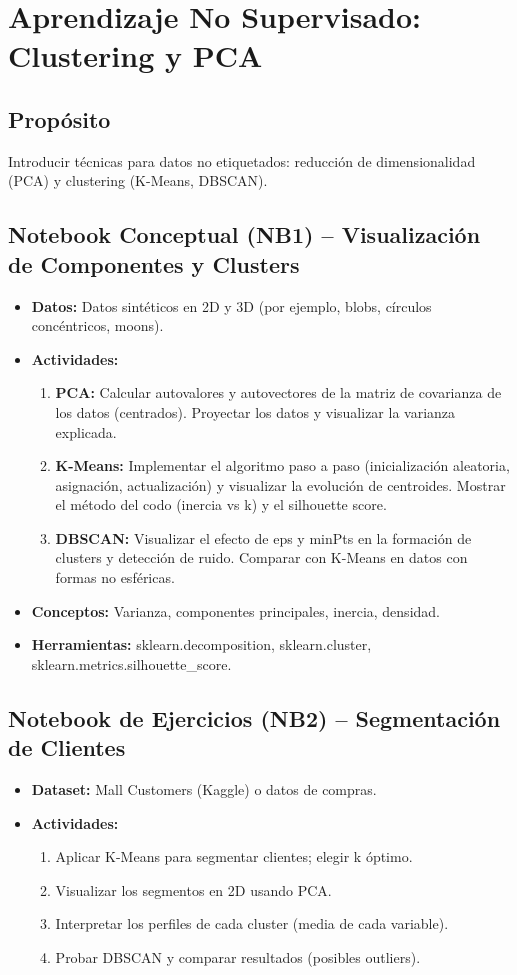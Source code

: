 \documentclass[12pt,a4paper]{article}
\begin{document}
\section{Aprendizaje No Supervisado: Clustering y PCA}
\subsection*{Propósito}
Introducir técnicas para datos no etiquetados: reducción de dimensionalidad (PCA) y clustering (K-Means, DBSCAN).

\subsection*{Notebook Conceptual (NB1) – Visualización de Componentes y Clusters}
\begin{itemize}
    \item \textbf{Datos:} Datos sintéticos en 2D y 3D (por ejemplo, blobs, círculos concéntricos, moons).
    \item \textbf{Actividades:}
    \begin{enumerate}
        \item \textbf{PCA:} Calcular autovalores y autovectores de la matriz de covarianza de los datos (centrados). Proyectar los datos y visualizar la varianza explicada.
        \item \textbf{K-Means:} Implementar el algoritmo paso a paso (inicialización aleatoria, asignación, actualización) y visualizar la evolución de centroides. Mostrar el método del codo (inercia vs k) y el silhouette score.
        \item \textbf{DBSCAN:} Visualizar el efecto de eps y minPts en la formación de clusters y detección de ruido. Comparar con K-Means en datos con formas no esféricas.
    \end{enumerate}
    \item \textbf{Conceptos:} Varianza, componentes principales, inercia, densidad.
    \item \textbf{Herramientas:} sklearn.decomposition, sklearn.cluster, sklearn.metrics.silhouette\_score.
\end{itemize}

\subsection*{Notebook de Ejercicios (NB2) – Segmentación de Clientes}
\begin{itemize}
    \item \textbf{Dataset:} Mall Customers (Kaggle) o datos de compras.
    \item \textbf{Actividades:}
    \begin{enumerate}
        \item Aplicar K-Means para segmentar clientes; elegir k óptimo.
        \item Visualizar los segmentos en 2D usando PCA.
        \item Interpretar los perfiles de cada cluster (media de cada variable).
        \item Probar DBSCAN y comparar resultados (posibles outliers).
    \end{enumerate}
\end{itemize}
\end{document}
